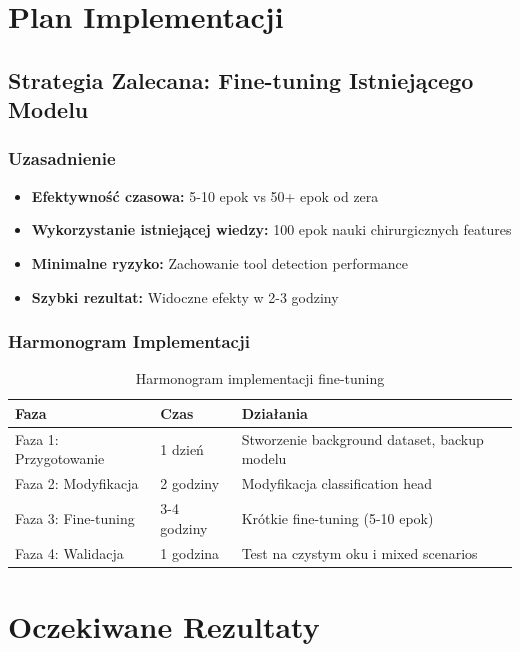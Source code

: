 \documentclass[12pt,a4paper]{article}
\begin{document}
\section{Plan Implementacji}

\subsection{Strategia Zalecana: Fine-tuning Istniejącego Modelu}

\subsubsection{Uzasadnienie}

\begin{itemize}
    \item \textbf{Efektywność czasowa:} 5-10 epok vs 50+ epok od zera
    \item \textbf{Wykorzystanie istniejącej wiedzy:} 100 epok nauki chirurgicznych features
    \item \textbf{Minimalne ryzyko:} Zachowanie tool detection performance
    \item \textbf{Szybki rezultat:} Widoczne efekty w 2-3 godziny
\end{itemize}

\subsubsection{Harmonogram Implementacji}

\begin{table}[H]
\centering
\begin{tabular}{|l|l|l|}
\hline
\textbf{Faza} & \textbf{Czas} & \textbf{Działania} \\
\hline
Faza 1: Przygotowanie & 1 dzień & Stworzenie background dataset, backup modelu \\
\hline
Faza 2: Modyfikacja & 2 godziny & Modyfikacja classification head \\
\hline
Faza 3: Fine-tuning & 3-4 godziny & Krótkie fine-tuning (5-10 epok) \\
\hline
Faza 4: Walidacja & 1 godzina & Test na czystym oku i mixed scenarios \\
\hline
\end{tabular}
\caption{Harmonogram implementacji fine-tuning}
\label{tab:implementation_schedule}
\end{table}

\section{Oczekiwane Rezultaty}
\end{document}

